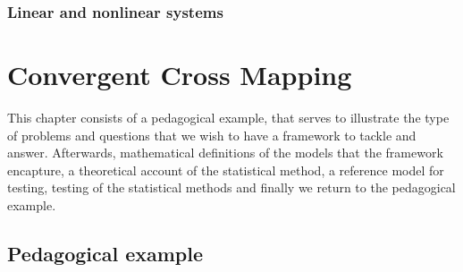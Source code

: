 \documentclass[11pt, a4paper]{memoir}
\theoremstyle{plain}
\theoremstyle{definition}
\begin{document}
\subsection{Linear and nonlinear systems}


\chapter{Convergent Cross Mapping}
This chapter consists of a pedagogical example, that serves to illustrate the type of problems and questions that we wish to have a framework to tackle and answer. Afterwards, mathematical definitions of the models that the framework encapture, a theoretical account of the statistical method, a reference model for testing, testing of the statistical methods and finally we return to the pedagogical example.
\section{Pedagogical example}
\end{document}

